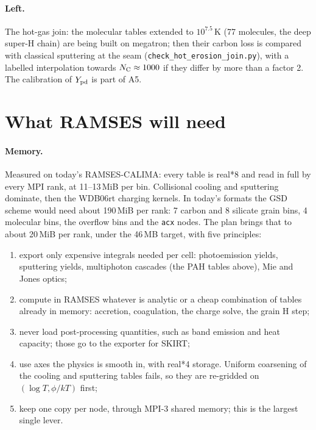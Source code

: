 \documentclass[11pt,a4paper]{article}
\newcommand{\NC}{N_{\rm C}}
\begin{document}
\paragraph{Left.} The hot-gas join: the molecular tables extended to $10^{7.5}$\,K (77 molecules, the deep super-H
chain) are being built on megatron; then their carbon loss is compared with classical sputtering at the seam
(\texttt{check\_hot\_erosion\_join.py}), with a labelled interpolation towards $\NC\approx1000$ if they differ by more
than a factor 2. The calibration of $Y_{\rm pd}$ is part of A5.

\section{What RAMSES will need}

\paragraph{Memory.} Measured on today's RAMSES-CALIMA: every table is real*8 and read in full by every MPI rank, at
11--13\,MiB per bin. Collisional cooling and sputtering dominate, then the WDB06rt charging kernels. In today's formats
the GSD scheme would need about 190\,MiB per rank: 7 carbon and 8 silicate grain bins, 4 molecular bins, the
overflow bins and the \texttt{acx} nodes. The plan brings that to about 20\,MiB per rank, under the 46\,MB target, with five principles:
\begin{enumerate}
\item export only expensive integrals needed per cell: photoemission yields, sputtering yields, multiphoton cascades
  (the PAH tables above), Mie and Jones optics;
\item compute in RAMSES whatever is analytic or a cheap combination of tables already in memory: accretion,
  coagulation, the charge solve, the grain H step;
\item never load post-processing quantities, such as band emission and heat capacity; those go to the exporter for
  SKIRT;
\item use axes the physics is smooth in, with real*4 storage. Uniform coarsening of the cooling and sputtering tables
  fails, so they are re-gridded on $(\log T, \phi/kT)$ first;
\item keep one copy per node, through MPI-3 shared memory; this is the largest single lever.
\end{enumerate}
\end{document}
